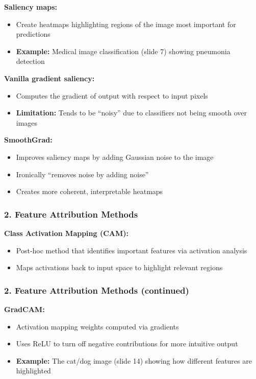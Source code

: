 \textbf{Saliency maps:}
\begin{itemize}
    \item Create heatmaps highlighting regions of the image most important for predictions
    \item \textbf{Example:} Medical image classification (slide 7) showing pneumonia detection
\end{itemize}

\textbf{Vanilla gradient saliency:}
\begin{itemize}
    \item Computes the gradient of output with respect to input pixels
    \item \textbf{Limitation:} Tends to be ``noisy'' due to classifiers not being smooth over images
\end{itemize}

\textbf{SmoothGrad:}
\begin{itemize}
    \item Improves saliency maps by adding Gaussian noise to the image
    \item Ironically ``removes noise by adding noise''
    \item Creates more coherent, interpretable heatmaps
\end{itemize}

\subsubsection*{2. Feature Attribution Methods}

\textbf{Class Activation Mapping (CAM):}
\begin{itemize}
    \item Post-hoc method that identifies important features via activation analysis
    \item Maps activations back to input space to highlight relevant regions
\end{itemize}

\subsubsection*{2. Feature Attribution Methods (continued)}

\textbf{GradCAM:}
\begin{itemize}
    \item Activation mapping weights computed via gradients
    \item Uses ReLU to turn off negative contributions for more intuitive output
    \item \textbf{Example:} The cat/dog image (slide 14) showing how different features are highlighted
\end{itemize}

